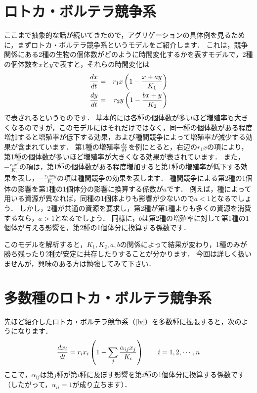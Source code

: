\documentclass[a5paper]{jsarticle}
\begin{document}
\section{ロトカ・ボルテラ競争系}
ここまで抽象的な話が続いてきたので，アグリゲーションの具体例を見るために，まずロトカ・ボルテラ競争系というモデルをご紹介します．
これは，競争関係にある2種の生物の個体数がどのように時間変化するかを表すモデルで，2種の個体数を$x$と$y$で表すと，それらの時間変化は
\begin{eqnarray}
  \dv{x}{t} & = & r_1x\left(1 - \frac{x + ay}{K_1}\right) \nonumber\\[-3mm]
  \label{lv} && \\[-3mm]
  \dv{y}{t} & = & r_2y\left(1 - \frac{bx + y}{K_2}\right) \nonumber
\end{eqnarray}
で表されるというものです．
基本的には各種の個体数が多いほど増殖率も大きくなるのですが，このモデルにはそれだけではなく，同一種の個体数がある程度増加すると増殖率が低下する効果，および種間競争によって増殖率が減少する効果が含まれています．
第1種の増殖率$\dv{x}{t}$を例にとると，右辺の$r_1x$の項により，第1種の個体数が多いほど増殖率が大きくなる効果が表されています．
また，$-\frac{r_1x^2}{K_1}$の項は，第1種の個体数がある程度増加すると第1種の増殖率が低下する効果を表し，$-\frac{r_1axy}{K_1}$の項は種間競争の効果を表します．
種間競争による第2種の1個体の影響を第1種の1個体分の影響に換算する係数が$a$です．
例えば，種によって用いる資源が異なれば，同種の1個体よりも影響が少ないので$a < 1$となるでしょう．
しかし，2種が共通の資源を要求し，第2種が第1種よりも多くの資源を消費するなら，$a > 1$となるでしょう．
同様に，$b$は第2種の増殖率に対して第1種の1個体が与える影響を，第2種の1個体分に換算する係数です．

このモデルを解析すると，$K_1, K_2, a, b$の関係によって結果が変わり，1種のみが勝ち残ったり2種が安定に共存したりすることが分かります．
今回は詳しく扱いませんが，興味のある方は勉強してみて下さい．
\section{多数種のロトカ・ボルテラ競争系}
先ほど紹介したロトカ・ボルテラ競争系（\ref{lv}）を多数種に拡張すると，次のようになります．
\begin{equation}
  \dv{x_i}{t} = r_ix_i\left(1 - \sum_j\frac{\alpha_{ij}x_j}{K_i}\right) \qquad i = 1, 2, \cdots, n \label{multi}
\end{equation}
ここで，$\alpha_{ij}$は第$j$種が第$i$種に及ぼす影響を第$i$種の1個体分に換算する係数です（したがって，$\alpha_{ii} = 1$が成り立ちます）．
\end{document}
